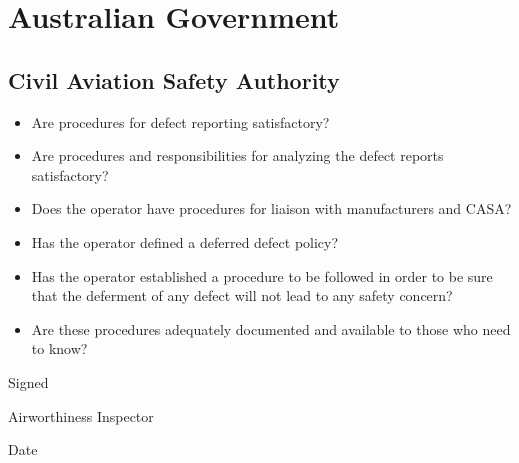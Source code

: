 \documentclass[11pt]{article}
\begin{document}
\section*{Australian Government}
\subsection*{Civil Aviation Safety Authority}

\begin{itemize}[leftmargin=*]
    \item Are procedures for defect reporting satisfactory? \hfill {}   
    \item Are procedures and responsibilities for analyzing the defect reports satisfactory? \hfill {}   
    \item Does the operator have procedures for liaison with manufacturers and CASA? \hfill {}   
    \item Has the operator defined a deferred defect policy? \hfill {}   
    \item Has the operator established a procedure to be followed in order to be sure that the deferment of any defect will not lead to any safety concern? \hfill {}   
    \item Are these procedures adequately documented and available to those who need to know? \hfill {}   
\end{itemize}

\vspace{1cm}
\noindent Signed \hrulefill

\noindent Airworthiness Inspector \hrulefill

\noindent Date \hrulefill
\end{document}

